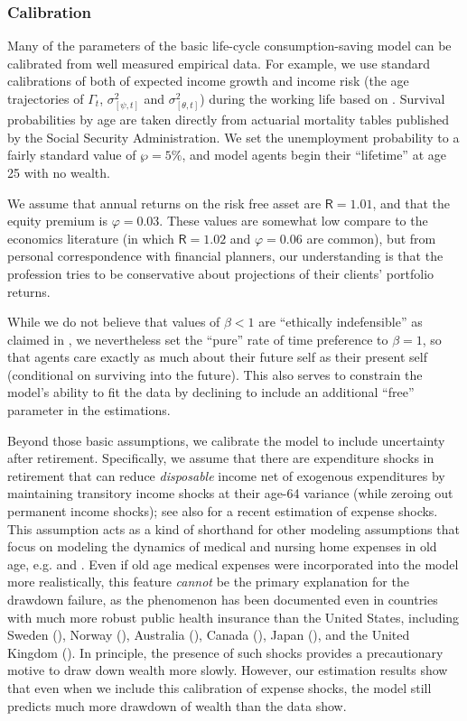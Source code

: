\documentclass{article}
\newcommand{\DiscFac}{\beta}
\newcommand{\permGroFac}{\Gamma}
\newcommand{\permShk}{\psi}
\newcommand{\tranShk}{\theta}
\newcommand{\pZero}{\wp}
\newcommand{\Rfree}{\mathsf{R}}
\newcommand{\eprem}{\varphi}
\begin{document}
\bigskip\subsubsection{Calibration}

Many of the parameters of the basic life-cycle consumption-saving model can be calibrated from well measured empirical data.
For example, we use standard calibrations of both of expected income growth and income risk (the age trajectories of $\permGroFac_t$, $\sigma_{[\permShk, t]}^2$ and $\sigma_{[\tranShk, t]}^2$) during the working life based on \cite{Cagetti2003}.
Survival probabilities by age are taken directly from actuarial mortality tables published by the Social Security Administration.
We set the unemployment probability to a fairly standard value of $\pZero = 5\%$, and
model agents begin their ``lifetime'' at age 25 with no wealth.

We assume that annual returns on the risk free asset are $\Rfree = 1.01$, and that the equity premium is $\eprem = 0.03$.
These values are somewhat low compare to the economics literature (in which $\Rfree = 1.02$ and $\eprem = 0.06$ are common), but from personal correspondence with financial planners, our understanding is that the profession tries to be conservative about projections of their clients' portfolio returns.

While we do not believe that values of $\DiscFac < 1$ are ``ethically indefensible'' as claimed in \cite{Ramsey1928}, we nevertheless set the ``pure'' rate of time preference to $\DiscFac=1$, so that agents care exactly as much about their future self as their present self (conditional on surviving into the future).
This also serves to constrain the model's ability to fit the data by declining to include an additional ``free'' parameter in the estimations.

Beyond those basic assumptions, we calibrate the model to include uncertainty after retirement.
Specifically, we assume that there are expenditure shocks in retirement that can reduce \textit{disposable} income net of exogenous expenditures by maintaining transitory income shocks at their age-64 variance (while zeroing out permanent income shocks); see also \cite{flExpShocks} for a recent estimation of expense shocks.
This assumption acts as a kind of shorthand for other modeling assumptions that focus on modeling the dynamics of medical and nursing home expenses in old age, e.g. \cite{ameriks2011joy} and \cite{DeNardi2010}.
Even if old age medical expenses were incorporated into the model more realistically, this feature \textit{cannot} be the primary explanation for the drawdown failure, as the phenomenon has been documented even in countries with much more robust public health insurance than the United States, including Sweden (\cite{Ljunge2013}), Norway (\cite{Hattrem2022}), Australia (\cite{AustralianWealth2021}), Canada (\cite{Hamilton2001}), Japan (\cite{Niimi2018}), and the United Kingdom (\cite{Crawford2018}).
In principle, the presence of such shocks provides a precautionary motive to draw down wealth more slowly.
However, our estimation results show that even when we include this calibration of expense shocks, the model still predicts much more drawdown of wealth than the data show.
\end{document}
